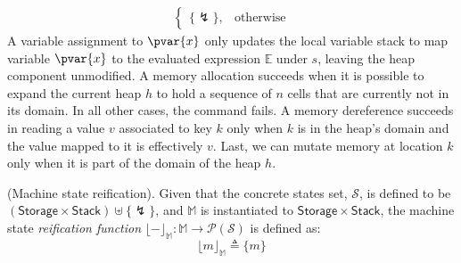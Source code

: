 \begin{defn}
\begin{align*}
\begin{cases}
			\{ \lightning \}, & \text{otherwise}
		\end{cases}
	\end{align*}
	A variable assignment to $\pvar{x}$ only updates the local variable stack to map variable $\pvar{x}$ to the evaluated expression $\mathds{E}$ under $s$, leaving the heap component unmodified. A memory allocation succeeds when it is possible to expand the current heap $h$ to hold a sequence of $n$ cells that are currently not in its domain. In all other cases, the command fails. A memory dereference succeeds in reading a value $v$ associated to key $k$ only when $k$ is in the heap's domain and the value mapped to it is effectively $v$. Last, we can mutate memory at location $k$ only when it is part of the domain of the heap $h$.
\end{defn}

\begin{defn}
	(Machine state reification).
	Given that the concrete states set, $\mathcal{S}$, is defined to be $(\mathsf{Storage} \times \mathsf{Stack}) \uplus \{\lightning\}$, and $\mathbb{M}$ is instantiated to $\mathsf{Storage} \times \mathsf{Stack}$, the machine state \emph{reification function} $\lfloor - \rfloor_\mathbb{M} : \mathbb{M} \rightarrow \mathcal{P}(\mathcal{S})$ is defined as:
	\[
		\lfloor m \rfloor_\mathbb{M} \triangleq \{ m \}
	\]
\end{defn}